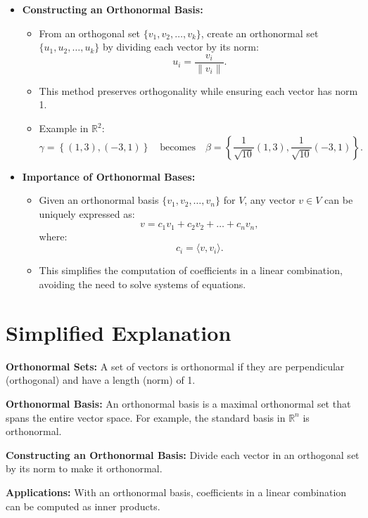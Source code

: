 \documentclass{article}
\begin{document}
\begin{itemize}
  \item \textbf{Constructing an Orthonormal Basis:}
    \begin{itemize}
      \item From an orthogonal set $\{v_1, v_2, \dots, v_k\}$, create an orthonormal set $\{u_1, u_2, \dots, u_k\}$ by dividing each vector by its norm:
        \[
          u_i = \frac{v_i}{\|v_i\|}.
        \]
      \item This method preserves orthogonality while ensuring each vector has norm 1.
      \item Example in $\mathbb{R}^2$:
        \[
          \gamma = \left\{(1, 3), (-3, 1)\right\} \quad \text{becomes} \quad \beta = \left\{\frac{1}{\sqrt{10}}(1, 3), \frac{1}{\sqrt{10}}(-3, 1)\right\}.
        \]
    \end{itemize}

  \item \textbf{Importance of Orthonormal Bases:}
    \begin{itemize}
      \item Given an orthonormal basis $\{v_1, v_2, \dots, v_n\}$ for $V$, any vector $v \in V$ can be uniquely expressed as:
        \[
          v = c_1 v_1 + c_2 v_2 + \dots + c_n v_n,
        \]
        where:
        \[
          c_i = \langle v, v_i \rangle.
        \]
      \item This simplifies the computation of coefficients in a linear combination, avoiding the need to solve systems of equations.
    \end{itemize}
\end{itemize}

\section*{Simplified Explanation}

\textbf{Orthonormal Sets:}
A set of vectors is orthonormal if they are perpendicular (orthogonal) and have a length (norm) of 1.

\textbf{Orthonormal Basis:}
An orthonormal basis is a maximal orthonormal set that spans the entire vector space. For example, the standard basis in $\mathbb{R}^n$ is orthonormal.

\textbf{Constructing an Orthonormal Basis:}
Divide each vector in an orthogonal set by its norm to make it orthonormal.

\textbf{Applications:}
With an orthonormal basis, coefficients in a linear combination can be computed as inner products.
\end{document}

